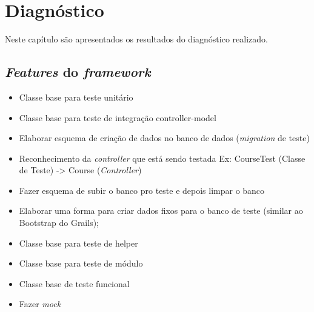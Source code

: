 \chapter{Diagnóstico}

Neste capítulo são apresentados os resultados do diagnóstico realizado.

\section{\textit{Features} do \textit{framework}}

\begin{itemize}

	\item Classe base para teste unitário
	\item Classe base para teste de integração controller-model
	\item Elaborar esquema de criação de dados no banco de dados (\textit{migration} de teste)
	\item Reconhecimento da \textit{controller} que está sendo testada
		\subitem Ex: CourseTest (Classe de Teste) -> Course (\textit{Controller})
	\item Fazer esquema de subir o banco pro teste e depois limpar o banco
	\item Elaborar uma forma para criar dados fixos para o banco de teste (similar ao Bootstrap do Grails);
	\item Classe base para teste de helper
	\item Classe base para teste de módulo
	\item Classe base de teste funcional
	\item Fazer \textit{mock}

\end{itemize}